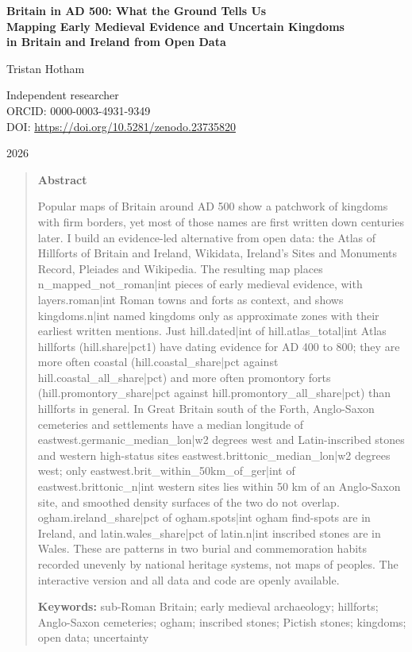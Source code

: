 \documentclass[11pt,a4paper]{article}
\begin{document}
\begin{center}
{\Large\bfseries Britain in AD 500: What the Ground Tells Us\\[2pt] Mapping Early Medieval Evidence and Uncertain Kingdoms\\[2pt] in Britain and Ireland from Open Data\par}
\vspace{1.2em}
{\large Tristan Hotham\par}
\vspace{0.3em}
{\small Independent researcher\\
ORCID: 0000-0003-4931-9349\\
DOI: \href{https://doi.org/10.5281/zenodo.23735820}{https://doi.org/10.5281/zenodo.23735820}\par}
\vspace{0.8em}
2026
\end{center}

\begin{quote}
\small
\begin{center}\textbf{Abstract}\end{center}
Popular maps of Britain around AD 500 show a patchwork of kingdoms with firm borders, yet most of those names are first written down centuries later. I build an evidence-led alternative from open data: the Atlas of Hillforts of Britain and Ireland, Wikidata, Ireland's Sites and Monuments Record, Pleiades and Wikipedia. The resulting map places {{n_mapped_not_roman|int}} pieces of early medieval evidence, with {{layers.roman|int}} Roman towns and forts as context, and shows {{kingdoms.n|int}} named kingdoms only as approximate zones with their earliest written mentions. Just {{hill.dated|int}} of {{hill.atlas_total|int}} Atlas hillforts ({{hill.share|pct1}}) have dating evidence for AD 400 to 800; they are more often coastal ({{hill.coastal_share|pct}} against {{hill.coastal_all_share|pct}}) and more often promontory forts ({{hill.promontory_share|pct}} against {{hill.promontory_all_share|pct}}) than hillforts in general. In Great Britain south of the Forth, Anglo-Saxon cemeteries and settlements have a median longitude of {{eastwest.germanic_median_lon|w2}} degrees west and Latin-inscribed stones and western high-status sites {{eastwest.brittonic_median_lon|w2}} degrees west; only {{eastwest.brit_within_50km_of_ger|int}} of {{eastwest.brittonic_n|int}} western sites lies within 50 km of an Anglo-Saxon site, and smoothed density surfaces of the two do not overlap. {{ogham.ireland_share|pct}} of {{ogham.spots|int}} ogham find-spots are in Ireland, and {{latin.wales_share|pct}} of {{latin.n|int}} inscribed stones are in Wales. These are patterns in two burial and commemoration habits recorded unevenly by national heritage systems, not maps of peoples. The interactive version and all data and code are openly available.

\textbf{Keywords:} sub-Roman Britain; early medieval archaeology; hillforts; Anglo-Saxon cemeteries; ogham; inscribed stones; Pictish stones; kingdoms; open data; uncertainty
\end{quote}
\end{document}
